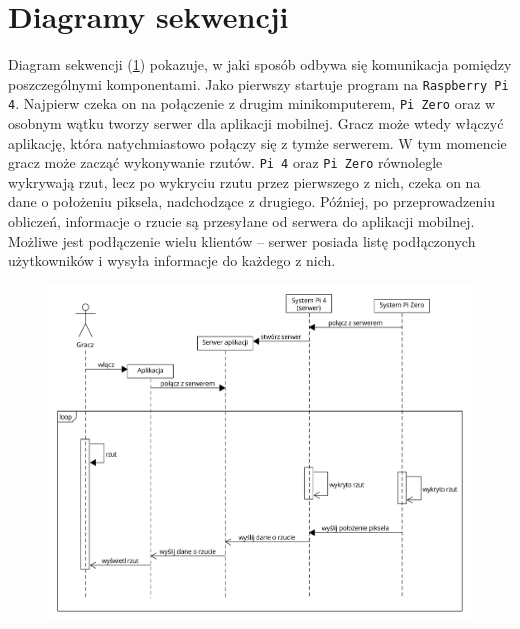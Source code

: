 \section{Diagramy sekwencji}
Diagram sekwencji (\ref{sequence}) pokazuje, w jaki sposób odbywa się komunikacja pomiędzy poszczególnymi komponentami. Jako pierwszy startuje program na \verb|Raspberry Pi 4|. Najpierw czeka on na połączenie z drugim minikomputerem, \verb|Pi Zero| oraz w osobnym wątku tworzy serwer dla aplikacji mobilnej. Gracz może wtedy włączyć aplikację, która natychmiastowo połączy się z tymże serwerem. W tym momencie gracz może zacząć wykonywanie rzutów. \verb|Pi 4| oraz \verb|Pi Zero| równolegle wykrywają rzut, lecz po wykryciu rzutu przez pierwszego z nich, czeka on na dane o położeniu piksela, nadchodzące z drugiego. Później, po przeprowadzeniu obliczeń, informacje o rzucie są przesyłane od serwera do aplikacji mobilnej. Możliwe jest podłączenie wielu klientów -- serwer posiada listę podłączonych użytkowników i wysyła informacje do każdego z nich. 
\begin{figure}[h!]
\begin{center}
\includegraphics[width=\textwidth]{obrazki/sequence.pdf}
\end{center}
\label{sequence}
\end{figure}

